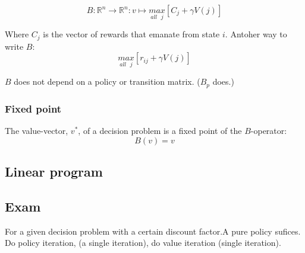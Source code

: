 \documentclass{article}
\begin{document}
\[B: \mathbb{R}^n \to \mathbb{R}^n : v \mapsto
	\underset{all\mbox{\ }j}{max}[C_j + \gamma V(j)] \]

Where $C_j$ is the vector of rewards that emanate from state $i$.
Antoher way to write $B:$
\[\underset{all\mbox{\ }j}{max}[r_{ij} + \gamma V(j)] \]

$B$ does not depend on a policy or transition matrix. ($B_p$ does.)

\subsubsection{Fixed point}
The value-vector, $v^*$, of a decision problem is a fixed point of the
$B$-operator:
\[ B(v) = v\]


\subsection{Linear program}
\subsection{Exam}
 For a given decision problem with a certain
discount factor.A pure policy sufices.
Do policy iteration, (a single iteration), do value iteration
(single iteration).

\end{document}
